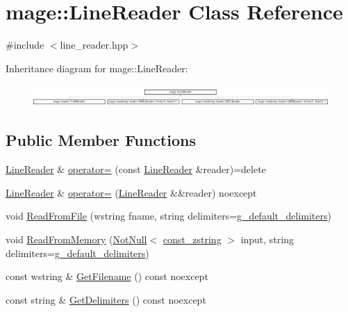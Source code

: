\hypertarget{classmage_1_1_line_reader}{}\section{mage\+:\+:Line\+Reader Class Reference}
\label{classmage_1_1_line_reader}


{\ttfamily \#include $<$line\+\_\+reader.\+hpp$>$}

Inheritance diagram for mage\+:\+:Line\+Reader\+:\begin{figure}[H]
\begin{center}
\leavevmode
\includegraphics[height=0.821114cm]{classmage_1_1_line_reader}
\end{center}
\end{figure}
\subsection*{Public Member Functions}
\begin{DoxyCompactItemize}
\item 
\hyperlink{classmage_1_1_line_reader}{Line\+Reader} \& \hyperlink{classmage_1_1_line_reader_a2247078d0b5602f9a9a6b74019832faf}{operator=} (const \hyperlink{classmage_1_1_line_reader}{Line\+Reader} \&reader)=delete
\item 
\hyperlink{classmage_1_1_line_reader}{Line\+Reader} \& \hyperlink{classmage_1_1_line_reader_a3ba691cb32a1ab5dcbe75498068c1b86}{operator=} (\hyperlink{classmage_1_1_line_reader}{Line\+Reader} \&\&reader) noexcept
\item 
void \hyperlink{classmage_1_1_line_reader_a6ee0c53351656ac4cd92db1d7c372cff}{Read\+From\+File} (wstring fname, string delimiters=\hyperlink{namespacemage_aa161198415efd9349da6187663250aea}{g\+\_\+default\+\_\+delimiters})
\item 
void \hyperlink{classmage_1_1_line_reader_a5aa9068792817b6d6dc840a44b788159}{Read\+From\+Memory} (\hyperlink{namespacemage_a8769f9d670d6b585ea306cb1062af94b}{Not\+Null}$<$ \hyperlink{namespacemage_abfd9206dc607ceb5d13ec68bf075a5c0}{const\+\_\+zstring} $>$ input, string delimiters=\hyperlink{namespacemage_aa161198415efd9349da6187663250aea}{g\+\_\+default\+\_\+delimiters})
\item 
const wstring \& \hyperlink{classmage_1_1_line_reader_a682ed8030c99a62d4409a01f9efa6d6b}{Get\+Filename} () const noexcept
\item 
const string \& \hyperlink{classmage_1_1_line_reader_aa00e1e27b614e11ec9f70e52d0bac551}{Get\+Delimiters} () const noexcept
\end{DoxyCompactItemize}
